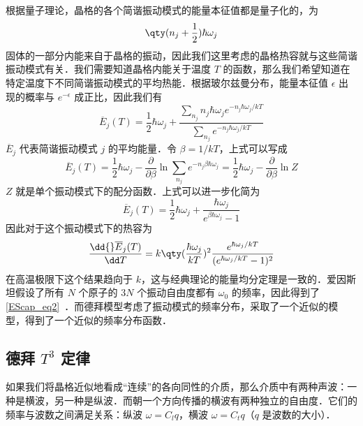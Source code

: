 

根据量子理论，晶格的各个简谐振动模式的能量本征值都是量子化的，为
\begin{equation}
\qty(n_j+\frac{1}{2})\hbar \omega_j
\end{equation}
固体的一部分内能来自于晶格的振动，因此我们这里考虑的晶格热容就与这些简谐振动模式有关．我们需要知道晶格内能关于温度 $T$ 的函数，那么我们希望知道在特定温度下不同简谐振动模式的平均热能．根据玻尔兹曼分布，能量本征值 $\epsilon$ 出现的概率与 $e^{-\epsilon}$ 成正比，因此我们有
\begin{equation}
\overline E_j(T)=\frac{1}{2}\hbar \omega_j + \frac{\sum_{n_j} n_j\hbar \omega_j e^{-n_j \hbar \omega_j / kT}}{\sum_{n_j} e^{-n_j \hbar \omega_j / kT}}
\end{equation}
$\overline E_j$ 代表简谐振动模式 $j$ 的平均能量．令 $\beta=1/kT$，上式可以写成
\begin{equation}
\overline E_j(T)=\frac{1}{2}\hbar \omega_j - \frac{\partial}{\partial \beta} \ln \sum_{n_j} e^{-n_j\beta\hbar\omega_j}=\frac{1}{2}\hbar \omega_j - \frac{\partial}{\partial \beta} \ln Z
\end{equation}
$Z$ 就是单个振动模式下的配分函数．上式可以进一步化简为
\begin{equation}
\overline E_j(T)=\frac{1}{2}\hbar \omega_j + \frac{\hbar \omega_j}{e^{\beta\hbar\omega_j}-1}
\end{equation}
因此对于这个振动模式下的热容为
\begin{equation}
\frac{\dd{} \overline E_j(T)}{\dd T}=k \qty(\frac{\hbar\omega_j}{kT})^2\frac{e^{\hbar \omega_j/kT}}{(e^{\hbar\omega_j/kT}-1)^2}
\end{equation}
在高温极限下这个结果趋向于 $k$，这与经典理论的能量均分定理是一致的．爱因斯坦假设了所有 $N$ 个原子的 $3N$ 个振动自由度都有 $\omega_0$ 的频率，因此得到了\autoref{EScap_eq2}~．而德拜模型考虑了振动模式的频率分布，采取了一个近似的模型，得到了一个近似的频率分布函数．

\subsection{德拜 $T^3$ 定律}
如果我们将晶格近似地看成“连续”的各向同性的介质，那么介质中有两种声波：一种是横波，另一种是纵波．而朝一个方向传播的横波有两种独立的自由度．它们的频率与波数之间满足关系：纵波 $\omega=C_l q$，横波 $\omega=C_t q$（$q$ 是波数的大小）．


